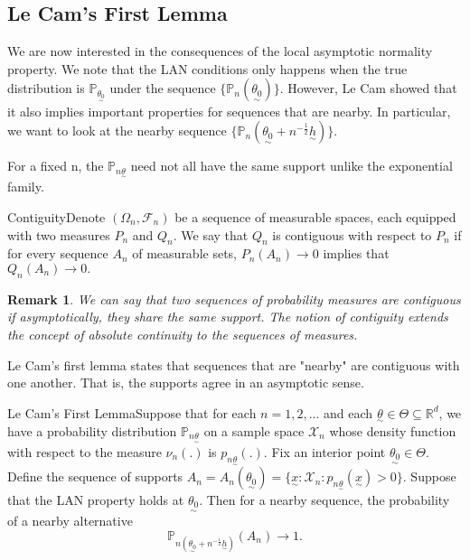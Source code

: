 \documentclass[twoside]{article}
\newtheorem{remark}[theorem]{Remark}
\newcommand{\sigmalgebra}{\mathcal{F}}
\newcommand{\prob}{\mathbb{P}}
\newcommand{\utilde}{\underset{\sim}}
\begin{document}
\subsection{Le Cam's First Lemma}

We are now interested in the consequences of the local asymptotic normality property. We note that the LAN conditions only happens when the true distribution is $\prob_{\utilde{\theta_0}}$ under the sequence $\{\prob_{n}(\utilde{\theta_0})\}$. However, Le Cam showed that it also implies important properties for sequences that are nearby. In particular, we want to look at the nearby sequence $\{\prob_{n}(\utilde{\theta_0} + n^{-\frac{1}{2}}\utilde{h})\}$.

For a fixed n, the $\mathbb{P}_{n \utilde{\theta}}$ need not all have the same support unlike the exponential family.
\begin{definition_exam}{Contiguity}{}Denote $(\Omega_n, \sigmalgebra_n)$ be a sequence of measurable spaces, each equipped with two measures $P_n$ and $Q_n.$ We say that $Q_n$ is contiguous with respect to $P_n$ if for every sequence $A_n$ of measurable sets, $P_n(A_n) \rightarrow 0$ implies that $Q_n(A_n) \rightarrow 0.$
\end{definition_exam}

\begin{remark}We can say that two sequences of probability measures are contiguous if asymptotically, they share the same support. The notion of contiguity extends the concept of absolute continuity to the sequences of measures.
\end{remark}

Le Cam's first lemma states that sequences that are "nearby" are contiguous with one another. That is, the supports agree in an asymptotic sense.

\begin{theorem_exam}{Le Cam's First Lemma}{}Suppose that for each $n = 1,2,...$ and each $\utilde{\theta} \in \Theta \subseteq \mathbb{R}^d$, we have a probability distribution $\prob_{n \utilde{\theta}}$ on a sample space $\mathcal{X}_n$ whose density function with respect to the measure $\nu_n(.)$ is $p_{n \utilde{\theta}}(.).$ Fix an interior point $\utilde{\theta_0} \in \Theta.$ Define the sequence of supports $A_n = A_n(\utilde{\theta_0}) = \{\utilde{x}: \mathcal{X}_n: p_{n \utilde{\theta}}(\utilde{x}) > 0 \}$. Suppose that the LAN property holds at $\utilde{\theta_0}$. Then for a nearby sequence, the probability of a nearby alternative
$$
\prob_{n(\utilde{\theta_0} + n^{-\frac{1}{2}}\utilde{h})}(A_n) \rightarrow 1.
$$
\end{theorem_exam}
\end{document}

